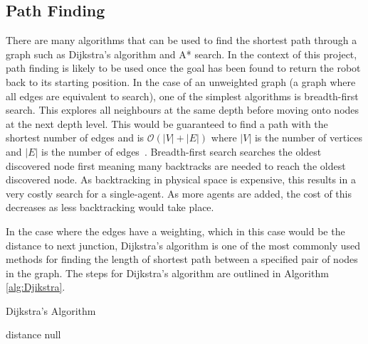 \subsection{Path Finding}\label{litreview/maze/path}
There are many algorithms that can be used to find the shortest path
through a graph such as Dijkstra's algorithm and A* search. In the
context of this project, path finding is likely to be used once
the goal has been found to return the robot back to its starting
position. In the case of an unweighted graph (a graph where all edges are
equivalent to search), one of the simplest algorithms
is breadth-first search. This explores all neighbours at the same depth
before moving onto nodes at the next depth level. This would be guaranteed
to find a path with the shortest number of edges and is $\mathcal{O}(|V| + |E|)$
where $|V|$ is the number of vertices and $|E|$ is the number of edges~\cite{cormen2009introduction}.
Breadth-first search searches the oldest discovered node first meaning
many backtracks are needed to reach the oldest discovered node. As
backtracking in physical space is expensive, this results in a very
costly search for a single-agent. As more agents are added, the cost of this
decreases as less backtracking would take place.

In the case where the edges have a weighting, which in this case would be the
distance to next junction, Dijkstra's algorithm is one
of the most commonly used methods for finding the length of shortest path between a specified pair of nodes in the graph. The steps for Dijkstra's algorithm are outlined in Algorithm \ref{alg:Djikstra}.

\begin{algorithm}
\caption{Dijkstra's Algorithm}
\label{alg:Djikstra}
\begin{algorithmic}
\ENDFOR
{}
\REPEAT
  	\RETURN distance
  \ENDIF
    \RETURN null
  \ENDIF

    \ENDIF
  \ENDFOR

\end{algorithmic}
\end{algorithm}

